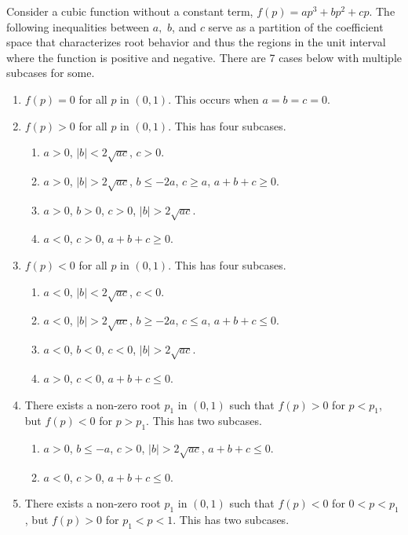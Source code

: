 \begin{prop}
\begin{enumerate}
    \end{enumerate}
    Consider a cubic function without a constant term, $f(p)=ap^3+bp^2 +cp$.  The following inequalities between $a,$ $b$, and $c$ serve as a partition of the coefficient space that characterizes root behavior and thus the regions in the unit interval where the function is positive and negative. There are 7 cases below with multiple subcases for some.
    \begin{enumerate}
        \item $f(p)=0$ for all $p$ in $(0,1)$. This occurs when $a=b=c=0$.
        \item $f(p)>0$ for all $p$ in $(0,1)$. This has four subcases.
        \begin{enumerate}
            \item $a>0$, $|b|<2\sqrt{ac}$, $c>0$.
            \item $a>0$, $|b|>2\sqrt{ac}$, $b\leq -2a$, $c\geq a$, $a+b+c\geq 0$.
            \item $a>0$, $b>0$, $c>0$, $|b|>2\sqrt{ac}$.
            \item $a<0$, $c>0$, $a+b+c\geq 0$.
        \end{enumerate}
        \item $f(p)<0$ for all $p$ in $(0,1)$. This has four subcases.
        \begin{enumerate}
            \item $a<0$, $|b|<2\sqrt{ac}$, $c<0$.
            \item $a<0$, $|b|>2\sqrt{ac}$, $b\geq -2a$, $c\leq a$, $a+b+c\leq 0$.
            \item $a<0$, $b<0$, $c<0$, $|b|>2\sqrt{ac}$.
            \item $a>0$, $c<0$, $a+b+c\leq 0$.
        \end{enumerate}
        \item There exists a non-zero root $p_1$ in $(0,1)$ such that $f(p)>0$ for $p<p_1$, but $f(p)<0$ for $p>p_1$. This has two subcases.
        \begin{enumerate}
            \item $a>0$, $b\leq -a$, $c>0$, $|b|>2\sqrt{ac}$, $a+b+c\leq0$.
            \item $a<0$, $c>0$, $a+b+c\leq 0$.
        \end{enumerate}
        \item There exists a non-zero root $p_1$ in $(0,1)$ such that $f(p)<0$ for $0<p<p_1$, but $f(p)>0$ for $p_1<p<1$. This has two subcases.
        \begin{enumerate}

\end{enumerate}
\end{enumerate}
\end{prop}
